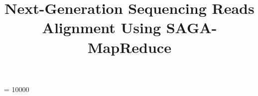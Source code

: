 \documentclass{sig-alternate}
\begin{document}
 {}
\widowpenalty = 10000



\newif\ifdraft
\drafttrue                                                                                                   

\ifdraft
 \newcommand{\jkimnote}[1]{{\textcolor{green}   { ***Joohyun:   #1 }}}
 \newcommand{\jhanote}[1]{  {\textcolor{red}     { ***SJ: #1 }}}
  \newcommand{\pmnote}[1]{  {\textcolor{red}     { ***Pradeep: #1 }}}
 \newcommand{\todo}[1]{  {\textcolor{red}     { ***TODO: #1 }}}
 \newcommand{\fix}[1]{  {\textcolor{red}     { ***FIX: #1 }}}
 \newcommand{\reviewer}[1]{}
\else
 \newcommand{\reviewer}[1]{}
 \newcommand{\jkimnote}[1]{}
 \newcommand{\pmnote}[1]{}
 \newcommand{\jhanote}[1]{}
 \newcommand{\todo}[1]{  {\textcolor{red}     { ***TODO: #1 }}}
 \newcommand{\fix}[1]{}                                                                                     
\fi

\title{Next-Generation Sequencing Reads Alignment Using SAGA-MapReduce}
\end{document}
